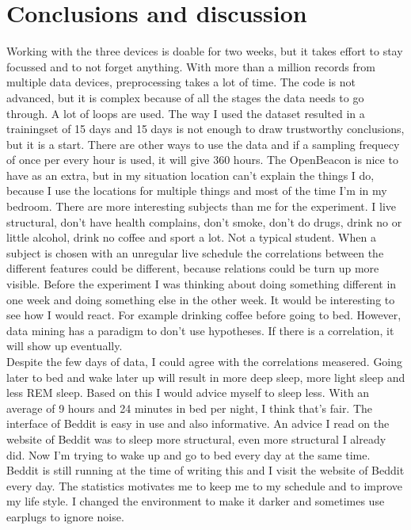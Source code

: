 \section{Conclusions and discussion}
	Working with the three devices is doable for two weeks, but it takes effort to stay focussed and to not forget anything. With more than a million records from multiple data devices, preprocessing takes a lot of time. The code is not advanced, but it is complex because of all the stages the data needs to go through. A lot of loops are used. The way I used the dataset resulted in a trainingset of 15 days and 15 days is not enough to draw trustworthy conclusions, but it is a start. There are other ways to use the data and if a sampling frequecy of once per every hour is used, it will give 360 hours. The OpenBeacon is nice to have as an extra, but in my situation location can't explain the things I do, because I use the locations for multiple things and most of the time I'm in my bedroom. 
	There are more interesting subjects than me for the experiment. I live structural, don't have health complains, don't smoke, don't do drugs, drink no or little alcohol, drink no coffee and sport a lot. Not a typical student. When a subject is chosen with an unregular live schedule the correlations between the different features could be different, because relations could be turn up more visible. Before the experiment I was thinking about doing something different in one week and doing something else in the other week. It would be interesting to see how I would react. For example drinking coffee before going to bed. However, data mining has a paradigm to don't use hypotheses. If there is a correlation, it will show up eventually.
	\\
	Despite the few days of data, I could agree with the correlations measered. Going later to bed and wake later up will result in more deep sleep, more light sleep and less REM sleep. Based on this I would advice myself to sleep less. With an average of 9 hours and 24 minutes in bed per night, I think that's fair. The interface of Beddit is easy in use and also informative. An advice I read on the website of Beddit was to sleep more structural, even more structural I already did. Now I'm trying to wake up and go to bed every day at the same time. Beddit is still running at the time of writing this and I visit the website of Beddit every day. The statistics motivates me to keep me to my schedule and to improve my life style. I changed the environment to make it darker and sometimes use earplugs to ignore noise. 
